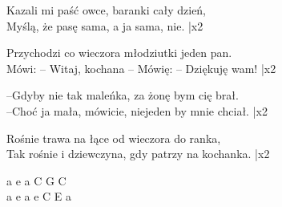 \begin{text}
    Kazali mi paść owce, baranki cały dzień,\\
    Myślą, że pasę sama, a ja sama, nie. |x2

    Przychodzi co wieczora młodziutki jeden pan.\\
    Mówi: – Witaj, kochana – Mówię: – Dziękuję wam! |x2

    –Gdyby nie tak maleńka, za żonę bym cię brał.\\
    –Choć ja mała, mówicie, niejeden by mnie chciał. |x2

    Rośnie trawa na łące od wieczora do ranka,\\
    Tak rośnie i dziewczyna, gdy patrzy na kochanka. |x2
\end{text}
\begin{chord}
    a e a C G C\\
    a e a e C E a
\end{chord}
